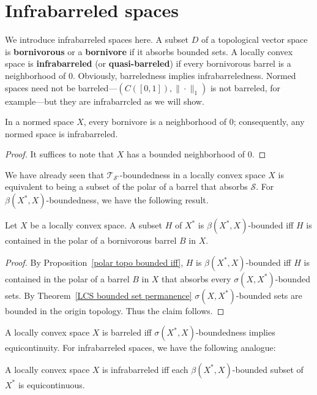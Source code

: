 \section{Infrabarreled spaces}
We introduce infrabarreled spaces here. A subset $D$ of a topological vector space is \textbf{bornivorous} or a \textbf{bornivore} if it absorbs bounded sets. A locally convex space is \textbf{infrabarreled} (or \textbf{quasi-barreled}) if every bornivorous barrel is a neighborhood of $0$. Obviously, barreledness implies infrabarreledness. Normed spaces need not be barreled---$(C([0,1]),\|\cdot\|_1)$ is not barreled, for example---but they are infrabarrcled as we will show.
\begin{proposition}\label{NVS is infrabarreled}
In a normed space $X$, every bornivore is a neighborhood of $0$; consequently, any normed space is infrabarreled.
\end{proposition}
\begin{proof}
It suffices to note that $X$ has a bounded neighborhood of $0$.
\end{proof}
We have already seen that $\mathcal{T}_{\mathcal{S}^\circ}$-boundedness in a locally convex space $X$ is equivalent to being a subset of the polar of a barrel that absorbs $\mathcal{S}$. For $\beta(X^*,X)$-boundedness, we have the following result.
\begin{proposition}\label{LCS strongly bounded iff in polar of bornivorous barrel}
Let $X$ be a locally convex space. A subset $H$ of $X^*$ is $\beta(X^*,X)$-bounded iff $H$ is contained in the polar of a bornivorous barrel $B$ in $X$.
\end{proposition}
\begin{proof}
By Proposition~\ref{polar topo bounded iff}, $H$ is $\beta(X^*,X)$-bounded iff $H$ is contained in the polar of a barrel $B$ in $X$ that absorbs every $\sigma(X,X^*)$-bounded sets. By Theorem~\ref{LCS bounded set permanence} $\sigma(X,X^*)$-bounded sets are bounded in the origin topology. Thus the claim follows.
\end{proof}
A locally convex space $X$ is barreled iff $\sigma(X^*,X)$-boundedness implies equicontinuity. For infrabarreled spaces, we have the following analogue:
\begin{theorem}\label{Banach-Steinhaus for infrabarreled space}
A locally convex space $X$ is infrabarreled iff each $\beta(X^*,X)$-bounded subset of $X^*$ is equicontinuous.
\end{theorem}
